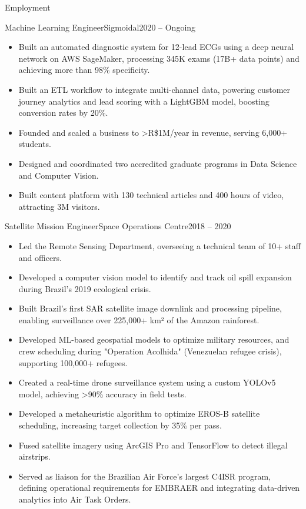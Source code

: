 \documentclass[]{mcdowellcv}
\begin{document}
	\makeheader
	
	\begin{cvsection}{Employment}
		\begin{cvsubsection}{Machine Learning Engineer}{Sigmoidal}{2020 -- Ongoing}
			\begin{itemize}
				\item Built an automated diagnostic system for 12-lead ECGs using a deep neural network on AWS SageMaker, processing 345K exams (17B+ data points) and achieving more than 98\% specificity.
				\item Built an ETL workflow to integrate multi-channel data, powering customer journey analytics and lead scoring with a LightGBM model, boosting conversion rates by 20\%.
				\item Founded and scaled a business to >R\$1M/year in revenue, serving 6,000+ students.
				\item Designed and coordinated two accredited graduate programs in Data Science and Computer Vision.
				\item Built content platform with 130 technical articles and 400 hours of video, attracting 3M visitors.
			\end{itemize}
		\end{cvsubsection}
		
		\begin{cvsubsection}{Satellite Mission Engineer}{Space Operations Centre}{2018 -- 2020}			
			\begin{itemize}
				\item Led the Remote Sensing Department, overseeing a technical team of 10+ staff and officers.
				\item Developed a computer vision model to identify and track oil spill expansion during Brazil's 2019 ecological crisis.
				\item Built Brazil’s first SAR satellite image downlink and processing pipeline, enabling surveillance over 225,000+ km² of the Amazon rainforest.
				\item Developed ML-based geospatial models to optimize military resources, and crew scheduling during "Operation Acolhida" (Venezuelan refugee crisis), supporting 100,000+ refugees.
				\item Created a real-time drone surveillance system using a custom YOLOv5 model, achieving >90\% accuracy in field tests.
				\item Developed a metaheuristic algorithm to optimize EROS-B satellite scheduling, increasing target collection by 35\% per pass.
				\item Fused satellite imagery using ArcGIS Pro and TensorFlow to detect illegal airstrips.
				\item Served as liaison for the Brazilian Air Force’s largest C4ISR program, defining operational requirements for EMBRAER and integrating data-driven analytics into Air Task Orders.
			\end{itemize}
		\end{cvsubsection}
		

\end{cvsection}
\end{document}
